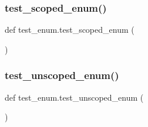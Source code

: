 \subsubsection{\texorpdfstring{test\_scoped\_enum()}{test\_scoped\_enum()}}
{\footnotesize\ttfamily def test\+\_\+enum.\+test\+\_\+scoped\+\_\+enum (\begin{DoxyParamCaption}{ }\end{DoxyParamCaption})}

\mbox{\label{namespacetest__enum_af1757cef01faa8f3c0ac8293a9beed52}} 
\subsubsection{\texorpdfstring{test\_unscoped\_enum()}{test\_unscoped\_enum()}}
{\footnotesize\ttfamily def test\+\_\+enum.\+test\+\_\+unscoped\+\_\+enum (\begin{DoxyParamCaption}{ }\end{DoxyParamCaption})}

